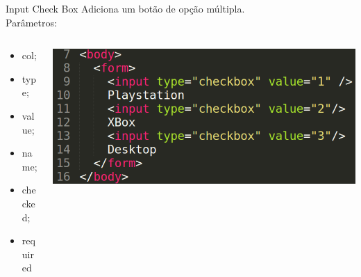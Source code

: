 \documentclass{beamer}
\begin{document}
\begin{frame}{Input Check Box}
  Adiciona um botão de opção múltipla. \\Parâmetros:
    \begin{columns}
    \begin{column}{0.3 \textwidth}
      \small
     \begin{itemize}
       \item col;
        \item type;
        \item value;
        \item name;
        \item checked;
        \item required
     \end{itemize}
    \end{column}
    
    \begin{column}{0.6\textwidth}
     \includegraphics[height=0.35\paperheight]{fig/aula4/aula4_11.png}
    \end{column}
  \end{columns}
\end{frame}
\end{document}
